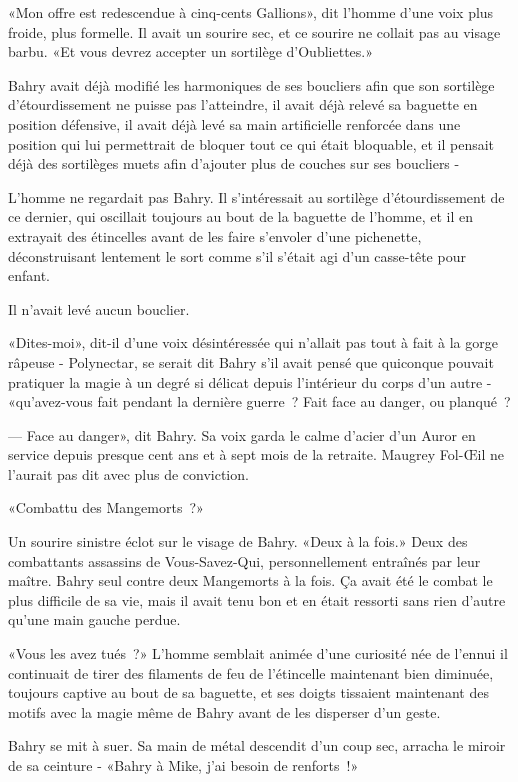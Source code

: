«Mon offre est redescendue à cinq-cents Gallions», dit l'homme d'une voix plus froide, plus formelle. Il avait un sourire sec, et ce sourire ne collait pas au visage barbu. «Et vous devrez accepter un sortilège d'Oubliettes.»

Bahry avait déjà modifié les harmoniques de ses boucliers afin que son sortilège d'étourdissement ne puisse pas l'atteindre, il avait déjà relevé sa baguette en position défensive, il avait déjà levé sa main artificielle renforcée dans une position qui lui permettrait de bloquer tout ce qui était bloquable, et il pensait déjà des sortilèges muets afin d'ajouter plus de couches sur ses boucliers -

L'homme ne regardait pas Bahry. Il s'intéressait au sortilège d'étourdissement de ce dernier, qui oscillait toujours au bout de la baguette de l'homme, et il en extrayait des étincelles avant de les faire s'envoler d'une pichenette, déconstruisant lentement le sort comme s'il s'était agi d'un casse-tête pour enfant.

Il n'avait levé aucun bouclier.

«Dites-moi», dit-il d'une voix désintéressée qui n'allait pas tout à fait à la gorge râpeuse - Polynectar, se serait dit Bahry s'il avait pensé que quiconque pouvait pratiquer la magie à un degré si délicat depuis l'intérieur du corps d'un autre - «qu'avez-vous fait pendant la dernière guerre~? Fait face au danger, ou planqué~?

--- Face au danger», dit Bahry. Sa voix garda le calme d'acier d'un Auror en service depuis presque cent ans et à sept mois de la retraite. Maugrey Fol-Œil ne l'aurait pas dit avec plus de conviction.

«Combattu des Mangemorts~?»

Un sourire sinistre éclot sur le visage de Bahry. «Deux à la fois.» Deux des combattants assassins de Vous-Savez-Qui, personnellement entraînés par leur maître. Bahry seul contre deux Mangemorts à la fois. Ça avait été le combat le plus difficile de sa vie, mais il avait tenu bon et en était ressorti sans rien d'autre qu'une main gauche perdue.

«Vous les avez tués~?» L'homme semblait animée d'une curiosité née de l'ennui il continuait de tirer des filaments de feu de l'étincelle maintenant bien diminuée, toujours captive au bout de sa baguette, et ses doigts tissaient maintenant des motifs avec la magie même de Bahry avant de les disperser d'un geste.

Bahry se mit à suer. Sa main de métal descendit d'un coup sec, arracha le miroir de sa ceinture - «Bahry à Mike, j'ai besoin de renforts~!»

